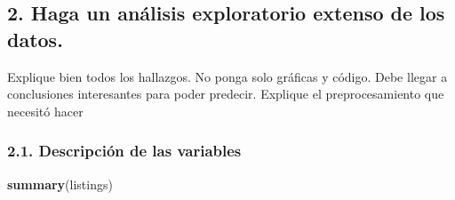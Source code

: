 \documentclass[
]{article}
\newenvironment{Shaded}{\begin{snugshade}}{\end{snugshade}}
\newcommand{\FunctionTok}[1]{\textcolor[rgb]{0.13,0.29,0.53}{\textbf{#1}}}
\newcommand{\NormalTok}[1]{#1}
\begin{document}
\subsection{2. Haga un análisis exploratorio extenso de los
datos.}\label{haga-un-anuxe1lisis-exploratorio-extenso-de-los-datos.}

Explique bien todos los hallazgos. No ponga solo gráficas y código. Debe
llegar a conclusiones interesantes para poder predecir. Explique el
preprocesamiento que necesitó hacer

\subsubsection{2.1. Descripción de las
variables}\label{descripciuxf3n-de-las-variables}

\begin{Shaded}
\begin{Highlighting}[]
\FunctionTok{summary}\NormalTok{(listings)}
\end{Highlighting}
\end{Shaded}
\end{document}
